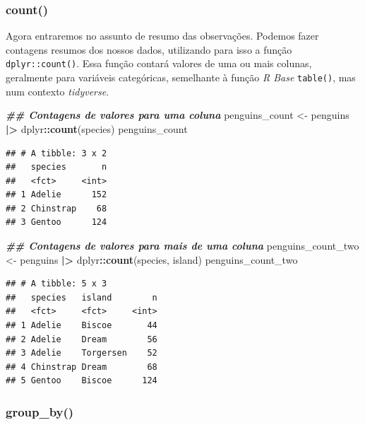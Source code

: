 \documentclass[
]{article}
\newenvironment{Shaded}{\begin{snugshade}}{\end{snugshade}}
\newcommand{\DocumentationTok}[1]{\textcolor[rgb]{0.56,0.35,0.01}{\textbf{\textit{#1}}}}
\newcommand{\FunctionTok}[1]{\textcolor[rgb]{0.13,0.29,0.53}{\textbf{#1}}}
\newcommand{\NormalTok}[1]{#1}
\newcommand{\OtherTok}[1]{\textcolor[rgb]{0.56,0.35,0.01}{#1}}
\newcommand{\SpecialCharTok}[1]{\textcolor[rgb]{0.81,0.36,0.00}{\textbf{#1}}}
\begin{document}
\hypertarget{count}{%
\subsubsection{count()}\label{count}}

Agora entraremos no assunto de resumo das observações. Podemos fazer contagens resumos dos nossos dados, utilizando para isso a função \texttt{dplyr::count()}. Essa função contará valores de uma ou mais colunas, geralmente para variáveis categóricas, semelhante à função \emph{R Base} \texttt{table()}, mas num contexto \emph{tidyverse}.

\begin{Shaded}
\begin{Highlighting}[]
\DocumentationTok{\#\# Contagens de valores para uma coluna}
\NormalTok{penguins\_count }\OtherTok{\textless{}{-}}\NormalTok{ penguins }\SpecialCharTok{|\textgreater{}} 
\NormalTok{    dplyr}\SpecialCharTok{::}\FunctionTok{count}\NormalTok{(species)}
\NormalTok{penguins\_count}
\end{Highlighting}
\end{Shaded}

\begin{verbatim}
## # A tibble: 3 x 2
##   species       n
##   <fct>     <int>
## 1 Adelie      152
## 2 Chinstrap    68
## 3 Gentoo      124
\end{verbatim}

\begin{Shaded}
\begin{Highlighting}[]
\DocumentationTok{\#\# Contagens de valores para mais de uma coluna}
\NormalTok{penguins\_count\_two }\OtherTok{\textless{}{-}}\NormalTok{ penguins }\SpecialCharTok{|\textgreater{}} 
\NormalTok{    dplyr}\SpecialCharTok{::}\FunctionTok{count}\NormalTok{(species, island)}
\NormalTok{penguins\_count\_two}
\end{Highlighting}
\end{Shaded}

\begin{verbatim}
## # A tibble: 5 x 3
##   species   island        n
##   <fct>     <fct>     <int>
## 1 Adelie    Biscoe       44
## 2 Adelie    Dream        56
## 3 Adelie    Torgersen    52
## 4 Chinstrap Dream        68
## 5 Gentoo    Biscoe      124
\end{verbatim}

\hypertarget{group_by}{%
\subsubsection{group\_by()}\label{group_by}}
\end{document}
